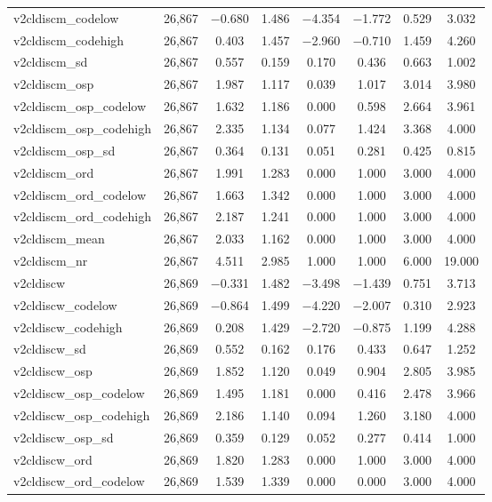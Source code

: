 \begin{table}[!htbp]
\begin{tabular}{@{\extracolsep{5pt}}lccccccc}
v2cldiscm\_codelow & 26,867 & $-$0.680 & 1.486 & $-$4.354 & $-$1.772 & 0.529 & 3.032 \\ 
v2cldiscm\_codehigh & 26,867 & 0.403 & 1.457 & $-$2.960 & $-$0.710 & 1.459 & 4.260 \\ 
v2cldiscm\_sd & 26,867 & 0.557 & 0.159 & 0.170 & 0.436 & 0.663 & 1.002 \\ 
v2cldiscm\_osp & 26,867 & 1.987 & 1.117 & 0.039 & 1.017 & 3.014 & 3.980 \\ 
v2cldiscm\_osp\_codelow & 26,867 & 1.632 & 1.186 & 0.000 & 0.598 & 2.664 & 3.961 \\ 
v2cldiscm\_osp\_codehigh & 26,867 & 2.335 & 1.134 & 0.077 & 1.424 & 3.368 & 4.000 \\ 
v2cldiscm\_osp\_sd & 26,867 & 0.364 & 0.131 & 0.051 & 0.281 & 0.425 & 0.815 \\ 
v2cldiscm\_ord & 26,867 & 1.991 & 1.283 & 0.000 & 1.000 & 3.000 & 4.000 \\ 
v2cldiscm\_ord\_codelow & 26,867 & 1.663 & 1.342 & 0.000 & 1.000 & 3.000 & 4.000 \\ 
v2cldiscm\_ord\_codehigh & 26,867 & 2.187 & 1.241 & 0.000 & 1.000 & 3.000 & 4.000 \\ 
v2cldiscm\_mean & 26,867 & 2.033 & 1.162 & 0.000 & 1.000 & 3.000 & 4.000 \\ 
v2cldiscm\_nr & 26,867 & 4.511 & 2.985 & 1.000 & 1.000 & 6.000 & 19.000 \\ 
v2cldiscw & 26,869 & $-$0.331 & 1.482 & $-$3.498 & $-$1.439 & 0.751 & 3.713 \\ 
v2cldiscw\_codelow & 26,869 & $-$0.864 & 1.499 & $-$4.220 & $-$2.007 & 0.310 & 2.923 \\ 
v2cldiscw\_codehigh & 26,869 & 0.208 & 1.429 & $-$2.720 & $-$0.875 & 1.199 & 4.288 \\ 
v2cldiscw\_sd & 26,869 & 0.552 & 0.162 & 0.176 & 0.433 & 0.647 & 1.252 \\ 
v2cldiscw\_osp & 26,869 & 1.852 & 1.120 & 0.049 & 0.904 & 2.805 & 3.985 \\ 
v2cldiscw\_osp\_codelow & 26,869 & 1.495 & 1.181 & 0.000 & 0.416 & 2.478 & 3.966 \\ 
v2cldiscw\_osp\_codehigh & 26,869 & 2.186 & 1.140 & 0.094 & 1.260 & 3.180 & 4.000 \\ 
v2cldiscw\_osp\_sd & 26,869 & 0.359 & 0.129 & 0.052 & 0.277 & 0.414 & 1.000 \\ 
v2cldiscw\_ord & 26,869 & 1.820 & 1.283 & 0.000 & 1.000 & 3.000 & 4.000 \\ 
v2cldiscw\_ord\_codelow & 26,869 & 1.539 & 1.339 & 0.000 & 0.000 & 3.000 & 4.000 \\ 

\end{tabular}
\end{table}
